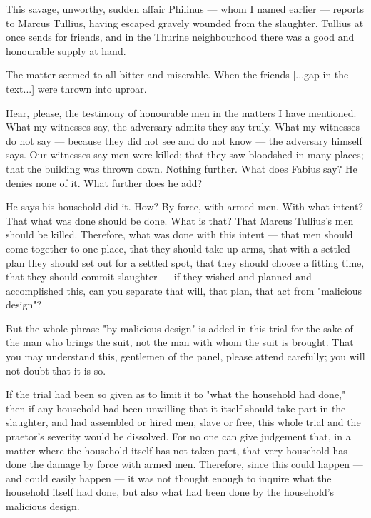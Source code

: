  This savage, unworthy, sudden affair Philinus --- whom I named earlier --- reports to Marcus Tullius, having escaped gravely wounded from the slaughter. Tullius at once sends for friends, and in the Thurine neighbourhood there was a good and honourable supply at hand.

 The matter seemed to all bitter and miserable. When the friends [...gap in the text...] were thrown into uproar.

 Hear, please, the testimony of honourable men in the matters I have mentioned. What my witnesses say, the adversary admits they say truly. What my witnesses do not say --- because they did not see and do not know --- the adversary himself says. Our witnesses say men were killed; that they saw bloodshed in many places; that the building was thrown down. Nothing further. What does Fabius say? He denies none of it. What further does he add?

 He says his household did it. How? By force, with armed men. With what intent? That what was done should be done. What is that? That Marcus Tullius's men should be killed. Therefore, what was done with this intent --- that men should come together to one place, that they should take up arms, that with a settled plan they should set out for a settled spot, that they should choose a fitting time, that they should commit slaughter --- if they wished and planned and accomplished this, can you separate that will, that plan, that act from "malicious design"?

 But the whole phrase "by malicious design" is added in this trial for the sake of the man who brings the suit, not the man with whom the suit is brought. That you may understand this, gentlemen of the panel, please attend carefully; you will not doubt that it is so.

 If the trial had been so given as to limit it to "what the household had done," then if any household had been unwilling that it itself should take part in the slaughter, and had assembled or hired men, slave or free, this whole trial and the praetor's severity would be dissolved. For no one can give judgement that, in a matter where the household itself has not taken part, that very household has done the damage by force with armed men. Therefore, since this could happen --- and could easily happen --- it was not thought enough to inquire what the household itself had done, but also what had been done by the household's malicious design.

